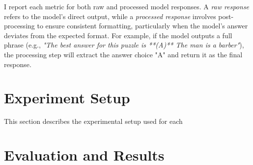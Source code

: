 I report each metric for both raw and processed model responses. A \textit{raw response} refers to the model's direct output, while a \textit{processed response} involves post-processing to ensure consistent formatting, particularly when the model's answer deviates from the expected format. For example, if the model outputs a full phrase (e.g., \textit{"The best answer for this puzzle is **(A)** The man is a barber"}), the processing step will extract the answer choice "A" and return it as the final response.

\section{Experiment Setup}

This section describes the experimental setup used for each

\section{Evaluation and Results}
